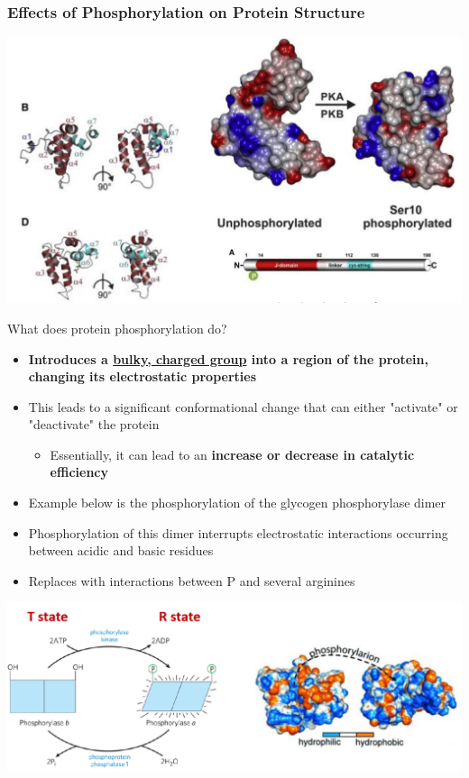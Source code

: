 \documentclass[10pt]{article}
\begin{document}
\subsubsection*{Effects of Phosphorylation on Protein Structure}
\begin{center} 
	\includegraphics*[width=\textwidth]{L1_13.png}
\end{center}
\pagebreak
What does protein phosphorylation do?
\begin{itemize}
	\item \textbf{Introduces a \underline{bulky, charged group} into a region of the protein, changing its electrostatic properties}
	\item This leads to a significant conformational change that can either "activate" or "deactivate" the protein
	\begin{itemize}
        \item Essentially, it can lead to an \textbf{increase or decrease in catalytic efficiency}
    \end{itemize}
    \item Example below is the phosphorylation of the glycogen phosphorylase dimer
    \item Phosphorylation of this dimer interrupts electrostatic interactions occurring between acidic and basic residues
    \item Replaces with interactions between P and several arginines
\end{itemize}
\begin{center} 
	\includegraphics*[width=\textwidth]{L1_14.png}
\end{center}
\end{document}
